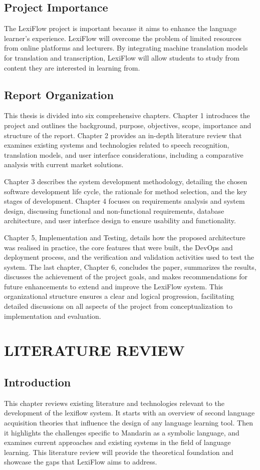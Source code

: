 \documentclass[oneside]{utmthesis}
\begin{document}
\section{Project Importance}
The LexiFlow project is important because it aims to enhance the language learner’s experience. LexiFlow will overcome the problem of limited resources from online platforms and lecturers. By integrating machine translation models for translation and transcription, LexiFlow will allow students to study from content they are interested in learning from.
\section{Report Organization}
This thesis is divided into six comprehensive chapters. Chapter 1 introduces the project and outlines the background, purpose, objectives, scope, importance and structure of the report. Chapter 2 provides an in-depth literature review that examines existing systems and technologies related to speech recognition, translation models, and user interface considerations, including a comparative analysis with current market solutions.

Chapter 3 describes the system development methodology, detailing the chosen software development life cycle, the rationale for method selection, and the key stages of development. Chapter 4 focuses on requirements analysis and system design, discussing functional and non-functional requirements, database architecture, and user interface design to ensure usability and functionality.

Chapter 5, Implementation and Testing, details how the proposed architecture was realised in practice, the core features that were built, the DevOps and deployment process, and the verification and validation activities used to test the system. The last chapter, Chapter 6, concludes the paper, summarizes the results, discusses the achievement of the project goals, and makes recommendations for future enhancements to extend and improve the LexiFlow system. This organizational structure ensures a clear and logical progression, facilitating detailed discussions on all aspects of the project from conceptualization to implementation and evaluation.
\chapter{LITERATURE REVIEW}
\section{Introduction}
This chapter reviews existing literature and technologies relevant to the development of the lexiflow system. It starts with an overview of second language acquisition theories that influence the design of any language learning tool. Then it highlights the challenges specific to Mandarin as a symbolic language, and examines current approaches and existing systems in the field of language learning. This literature review will provide the theoretical foundation and showcase the gaps that LexiFlow aims to address.
\end{document}
